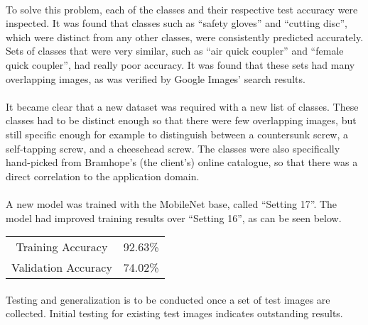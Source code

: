 \documentclass[a4paper, 11pt]{article}
\begin{document}
        \paragraph{}
        To solve this problem, each of the classes and their respective test accuracy were inspected. It was found that classes such as “safety gloves” and “cutting disc”, which were distinct from any other classes, were consistently predicted accurately. Sets of classes that were very similar, such as “air quick coupler” and “female quick coupler”, had really poor accuracy. It was found that these sets had many overlapping images, as was verified by Google Images’ search results.
        \paragraph{}
        It became clear that a new dataset was required with a new list of classes. These classes had to be distinct enough so that there were few overlapping images, but still specific enough for example to distinguish between a countersunk screw, a self-tapping screw, and a cheesehead screw. The classes were also specifically hand-picked from Bramhope’s (the client’s) online catalogue, so that there was a direct correlation to the application domain.
        \paragraph{}
        A new model was trained with the MobileNet base, called “Setting 17”. The model had improved training results over “Setting 16”, as can be seen below.
        \begin{center}
        \begin{tabular}{ |c|c| } 
         \hline
         Training Accuracy & 92.63\%\\
         Validation Accuracy & 74.02\%\\
         \hline
        \end{tabular}
        \end{center}
        \paragraph{}
        Testing and generalization is to be conducted once a set of test images are collected. Initial testing for existing test images indicates outstanding results.
\end{document}
